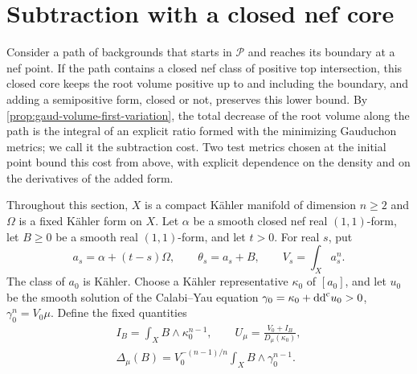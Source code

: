 \section{Subtraction with a closed nef core}
\label{sec:nef-boundary-subtraction}

Consider a path of backgrounds that starts in $\mathscr P$ and reaches its boundary at a nef point. If the path contains a closed nef class of positive top intersection, this closed core keeps the root volume positive up to and including the boundary, and adding a semipositive form, closed or not, preserves this lower bound. By \cref{prop:gaud-volume-first-variation}, the total decrease of the root volume along the path is the integral of an explicit ratio formed with the minimizing Gauduchon metrics; we call it the subtraction cost. Two test metrics chosen at the initial point bound this cost from above, with explicit dependence on the density and on the derivatives of the added form.

Throughout this section, $X$ is a compact K\"ahler manifold of dimension $n\geq2$ and $\Omega$ is a fixed K\"ahler form on $X$. Let $\alpha$ be a smooth closed nef real $(1,1)$-form, let $B\geq0$ be a smooth real $(1,1)$-form, and let $t>0$. For real $s$, put
\[
 a_s=\alpha+(t-s)\Omega,\qquad
 \theta_s=a_s+B,\qquad V_s=\int_Xa_s^n.
\]
The class of $a_0$ is K\"ahler. Choose a K\"ahler representative $\kappa_0$ of $[a_0]$, and let $u_0$ be the smooth solution of the Calabi--Yau equation
$\gamma_0=\kappa_0+\mathrm{dd}^{\mathrm{c}} u_0>0$, $\gamma_0^n=V_0\mu$.
Define the fixed quantities
\begin{equation}\label{eq:closed-core-fixed-tests}
 \begin{gathered}
 I_B=\int_XB\wedge\kappa_0^{n-1},\qquad
 U_\mu=\frac{V_0+I_B}{D_\mu(\kappa_0)},\\
 \Delta_\mu(B)=V_0^{-(n-1)/n}\int_XB\wedge\gamma_0^{n-1}.
 \end{gathered}
\end{equation}


